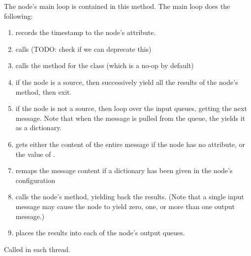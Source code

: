 \documentclass[letterpaper,10pt,english]{sphinxmanual}
\begin{document}
\begin{fulllineitems}
\begin{fulllineitems}
The node’s main loop is contained in this method. The main loop does
the following:
\begin{enumerate}
\def\theenumi{\arabic{enumi}}
\def\labelenumi{\theenumi .}
\makeatletter\def\p@enumii{\p@enumi \theenumi .}\makeatother
\item {} 
records the timestamp to the node’s  attribute.

\item {} 
calls  (TODO: check if we can deprecate this)

\item {} 
calls the  method for the class (which is a no-op by default)

\item {} 
if the node is a source, then successively yield all the results of
the node’s  method, then exit.

\item {} 
if the node is not a source, then loop over the input queues, getting
the next message. Note that when the message is pulled from the queue,
the  yields it as a dictionary.

\item {} 
gets either the content of the entire message if the node has no 
attribute, or the value of .

\item {} 
remaps the message content if a  dictionary has been
given in the node’s configuration

\item {} 
calls the node’s  method, yielding back the results.
(Note that a single input message may cause the node to yield zero,
one, or more than one output message.)

\item {} 
places the results into each of the node’s output queues.

\end{enumerate}

\end{fulllineitems}


\begin{fulllineitems}
\label{\detokenize{api:nanostream.node.NanoNode.stream}}
Called in each  thread.


\end{fulllineitems}
\end{fulllineitems}
\end{document}
